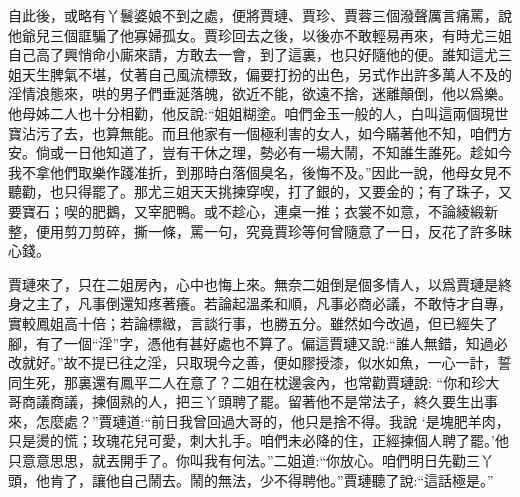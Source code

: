 \begin{parag}
    自此後，或略有丫鬟婆娘不到之處，便將賈璉、賈珍、賈蓉三個潑聲厲言痛罵，說他爺兒三個誆騙了他寡婦孤女。賈珍回去之後，以後亦不敢輕易再來，有時尤三姐自己高了興悄命小廝來請，方敢去一會，到了這裏，也只好隨他的便。誰知這尤三姐天生脾氣不堪，仗著自己風流標致，偏要打扮的出色，另式作出許多萬人不及的淫情浪態來，哄的男子們垂涎落魄，欲近不能，欲遠不捨，迷離顛倒，他以爲樂。他母姊二人也十分相勸，他反說:“姐姐糊塗。咱們金玉一般的人，白叫這兩個現世寶沾污了去，也算無能。而且他家有一個極利害的女人，如今瞞著他不知，咱們方安。倘或一日他知道了，豈有干休之理，勢必有一場大鬧，不知誰生誰死。趁如今我不拿他們取樂作踐准折，到那時白落個臭名，後悔不及。”因此一說，他母女見不聽勸，也只得罷了。那尤三姐天天挑揀穿喫，打了銀的，又要金的；有了珠子，又要寶石；喫的肥鵝，又宰肥鴨。或不趁心，連桌一推；衣裳不如意，不論綾緞新整，便用剪刀剪碎，撕一條，罵一句，究竟賈珍等何曾隨意了一日，反花了許多昧心錢。
\end{parag}


\begin{parag}
    賈璉來了，只在二姐房內，心中也悔上來。無奈二姐倒是個多情人，以爲賈璉是終身之主了，凡事倒還知疼著癢。若論起溫柔和順，凡事必商必議，不敢恃才自專，實較鳳姐高十倍；若論標緻，言談行事，也勝五分。雖然如今改過，但已經失了腳，有了一個“淫”字，憑他有甚好處也不算了。偏這賈璉又說:“誰人無錯，知過必改就好。”故不提已往之淫，只取現今之善，便如膠授漆，似水如魚，一心一計，誓同生死，那裏還有鳳平二人在意了？二姐在枕邊衾內，也常勸賈璉說: “你和珍大哥商議商議，揀個熟的人，把三丫頭聘了罷。留著他不是常法子，終久要生出事來，怎麼處？”賈璉道:“前日我曾回過大哥的，他只是捨不得。我說 ‘是塊肥羊肉，只是燙的慌；玫瑰花兒可愛，刺大扎手。咱們未必降的住，正經揀個人聘了罷。’他只意意思思，就丟開手了。你叫我有何法。”二姐道:“你放心。咱們明日先勸三丫頭，他肯了，讓他自己鬧去。鬧的無法，少不得聘他。”賈璉聽了說:“這話極是。”
\end{parag}


